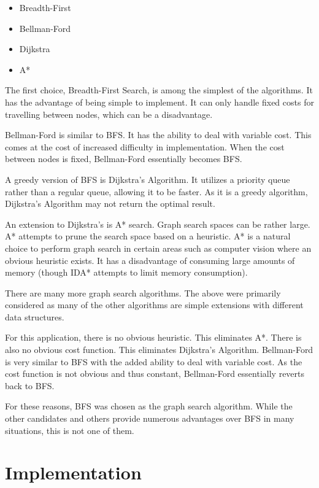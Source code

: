 \documentclass[12pt,letterpaper,oneside,notitlepage]{report}
\theoremstyle{definition}
\begin{document}
			\begin{itemize}
				\item Breadth-First
				\item Bellman-Ford
				\item Dijkstra
				\item A*
			\end{itemize}
			
			The first choice, Breadth-First Search, is among the simplest of the algorithms.  It has the advantage of being simple to implement.  It can only handle fixed costs for travelling between nodes, which can be a disadvantage.
			
			Bellman-Ford is similar to BFS.  It has the ability to deal with variable cost.  This comes at the cost of increased difficulty in implementation.  When the cost between nodes is fixed, Bellman-Ford essentially becomes BFS.
			
			A greedy version of BFS is Dijkstra's Algorithm.  It utilizes a priority queue rather than a regular queue, allowing it to be faster.  As it is a greedy algorithm, Dijkstra's Algorithm may not return the optimal result.
			
			An extension to Dijkstra's is A* search.  Graph search spaces can be rather large.  A* attempts to prune the search space based on a heuristic.  A* is a natural choice to perform graph search in certain areas such as computer vision where an obvious heuristic exists.  It has a disadvantage of consuming large amounts of memory (though IDA* attempts to limit memory consumption).
			
			There are many more graph search algorithms.  The above were primarily considered as many of the other algorithms are simple extensions with different data structures.
			
			For this application, there is no obvious heuristic.  This eliminates A*.  There is also no obvious cost function.  This eliminates Dijkstra's Algorithm.  Bellman-Ford is very similar to BFS with the added ability to deal with variable cost.  As the cost function is not obvious and thus constant, Bellman-Ford essentially reverts back to BFS.
			
			For these reasons, BFS was chosen as the graph search algorithm.  While the other candidates and others provide numerous advantages over BFS in many situations, this is not one of them.
	
	\chapter{Implementation}
\end{document}
